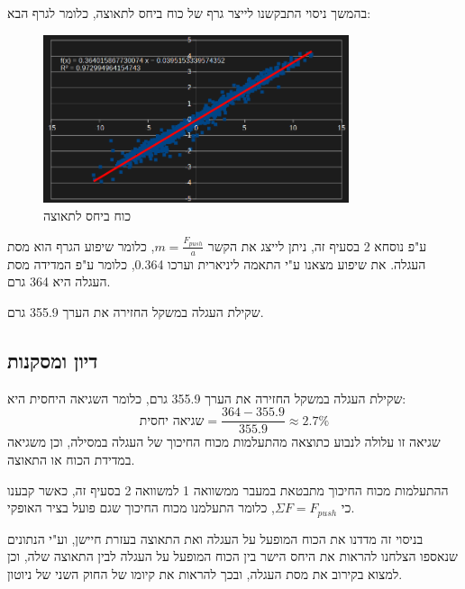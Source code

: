 \documentclass[14pt]{extarticle}
\begin{document}
בהמשך ניסוי התבקשנו לייצר גרף של כוח ביחס לתאוצה, כלומר לגרף הבא:
\begin{figure}[H]
    \centering
    \includegraphics[width=0.8\textwidth]{maman_13_experiment_3_force_to_acceleration.png}
    \caption{כוח ביחס לתאוצה}
\end{figure}

ע"פ נוסחא 2 בסעיף זה, ניתן לייצג את הקשר $m = \frac{F_{push}}{a}$, כלומר שיפוע הגרף הוא מסת העגלה.
את שיפוע מצאנו ע"י התאמה ליניארית וערכו 0.364, כלומר ע"פ המדידה מסת העגלה היא 364 גרם.

שקילת העגלה במשקל החזירה את הערך 355.9 גרם.

\subsection*{דיון ומסקנות}
שקילת העגלה במשקל החזירה את הערך 355.9 גרם, כלומר השגיאה היחסית היא:
\begin{equation}
\text{שגיאה יחסית} = \frac{364 - 355.9}{355.9} \approx 2.7\%
\end{equation}
שגיאה זו עלולה לנבוע כתוצאה מהתעלמות מכוח החיכוך של העגלה במסילה, וכן משגיאה במדידת הכוח או התאוצה.

ההתעלמות מכוח החיכוך מתבטאת במעבר ממשוואה 1 למשוואה 2 בסעיף זה, כאשר קבענו כי $\Sigma F = F_{push}$, כלומר התעלמנו מכוח החיכוך שגם פועל בציר האופקי.

בניסוי זה מדדנו את הכוח המופעל על העגלה ואת התאוצה בעזרת חיישן, וע"י הנתונים שנאספו הצלחנו להראות את היחס הישר בין הכוח המופעל על העגלה לבין התאוצה שלה, וכן למצוא בקירוב את מסת העגלה, ובכך להראות את קיומו של החוק השני של ניוטון.
\end{document}
